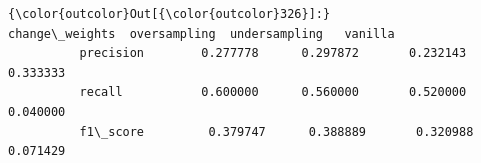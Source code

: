\documentclass[11pt]{article}
\begin{document}
\begin{Verbatim}[commandchars=\\\{\}]
{\color{outcolor}Out[{\color{outcolor}326}]:}            change\_weights  oversampling  undersampling   vanilla
          precision        0.277778      0.297872       0.232143  0.333333
          recall           0.600000      0.560000       0.520000  0.040000
          f1\_score         0.379747      0.388889       0.320988  0.071429
\end{Verbatim}
            

    
    
    
    
\end{document}
